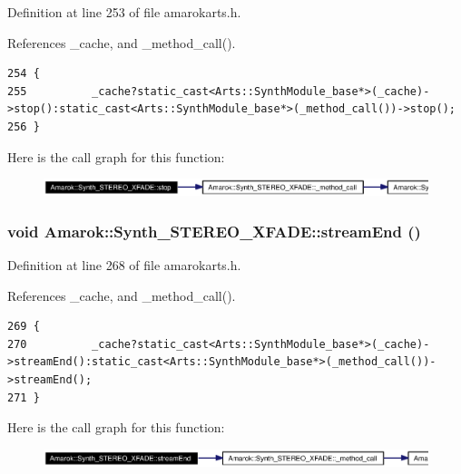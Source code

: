 Definition at line 253 of file amarokarts.h.

References \_\-cache, and \_\-method\_\-call().



\footnotesize\begin{verbatim}254 {
255          _cache?static_cast<Arts::SynthModule_base*>(_cache)->stop():static_cast<Arts::SynthModule_base*>(_method_call())->stop();
256 }
\end{verbatim}\normalsize 


Here is the call graph for this function:\begin{figure}[H]
\begin{center}
\leavevmode
\includegraphics[width=381pt]{classAmarok_1_1Synth__STEREO__XFADE_Amarok_1_1Synth__STEREO__XFADEa11_cgraph}
\end{center}
\end{figure}
\subsubsection{\setlength{\rightskip}{0pt plus 5cm}void Amarok::Synth\_\-STEREO\_\-XFADE::stream\-End ()\hspace{0.3cm}{\tt  [inline]}}\label{classAmarok_1_1Synth__STEREO__XFADE_Amarok_1_1Synth__STEREO__XFADEa14}




Definition at line 268 of file amarokarts.h.

References \_\-cache, and \_\-method\_\-call().



\footnotesize\begin{verbatim}269 {
270          _cache?static_cast<Arts::SynthModule_base*>(_cache)->streamEnd():static_cast<Arts::SynthModule_base*>(_method_call())->streamEnd();
271 }
\end{verbatim}\normalsize 


Here is the call graph for this function:\begin{figure}[H]
\begin{center}
\leavevmode
\includegraphics[width=396pt]{classAmarok_1_1Synth__STEREO__XFADE_Amarok_1_1Synth__STEREO__XFADEa14_cgraph}
\end{center}
\end{figure}
